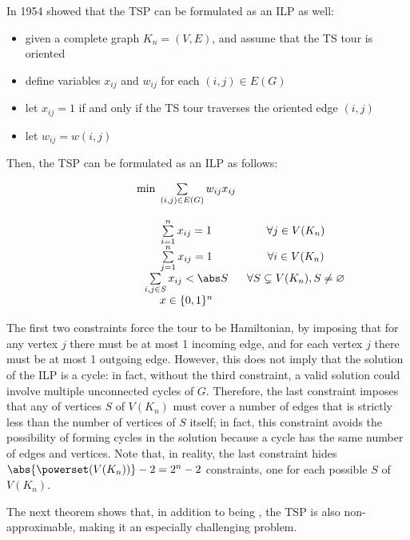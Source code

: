 \documentclass[a4paper, 12pt]{report}
\begin{document}
    In 1954 \textcite{dantzig} showed that the TSP can be formulated as an ILP as well:

    \begin{itemize}
        \item given a complete graph $K_n = (V, E)$, and assume that the TS tour is oriented
        \item define variables $x_{ij}$ and $w_{ij}$ for each $(i, j) \in E(G)$
        \item let $x_{ij} = 1$ if and only if the TS tour traverses the oriented edge $(i, j)$
        \item let $w_{ij} = w(i, j)$
    \end{itemize}

    Then, the TSP can be formulated as an ILP as follows:

    \[\begin{array}{ccc}
        \qquad\qquad\quad
        & \min \; \sum\limits_{(i, j) \in E(G)} {w_{ij}x_{ij}} \\\\
        & \sum\limits_{i = 1}^n {x_{ij}} = 1 & \forall j \in V(K_n) \\
        & \sum\limits_{j = 1}^n {x_{ij}} = 1 & \forall i \in V(K_n) \\
        & \sum\limits_{i, j \in S} {x_{ij}} < \abs S & \forall S \subsetneq V(K_n), S \neq \varnothing \\
        & x \in \{0,1\}^n
    \end{array}\]

    The first two constraints force the tour to be Hamiltonian, by imposing that for any vertex $j$ there must be at most 1 incoming edge, and for each vertex $j$ there must be at most 1 outgoing edge. However, this does not imply that the solution of the ILP is a cycle: in fact, without the third constraint, a valid solution could involve multiple unconnected cycles of $G$. Therefore, the last constraint imposes that any  of vertices $S$ of $V(K_n)$ must cover a number of edges that is strictly less than the number of vertices of $S$ itself; in fact, this constraint avoids the possibility of forming cycles in the solution because a cycle has the same number of edges and vertices. Note that, in reality, the last constraint hides $\abs{\powerset(V(K_n))} - 2 = 2^n - 2$ constraints, one for each possible  $S$ of $V(K_n)$.

    The next theorem shows that, in addition to being \NPComplete, the TSP is also non-approximable, making it an especially challenging problem.
\end{document}
